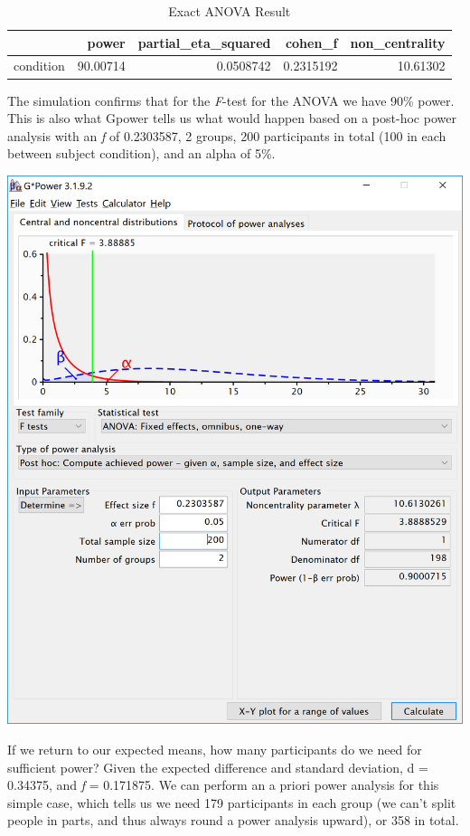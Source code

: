 \documentclass[
]{book}
\begin{document}
\begin{table}[!h]

\caption{\label{tab:unnamed-chunk-23}Exact ANOVA Result}
\centering
\begin{tabular}[t]{l|r|r|r|r}
\hline
  & power & partial\_eta\_squared & cohen\_f & non\_centrality\\
\hline
condition & 90.00714 & 0.0508742 & 0.2315192 & 10.61302\\
\hline
\end{tabular}
\end{table}

The simulation confirms that for the \emph{F}-test for the ANOVA we have 90\% power. This is also what Gpower tells us what would happen based on a post-hoc power analysis with an \emph{f} of 0.2303587, 2 groups, 200 participants in total (100 in each between subject condition), and an alpha of 5\%.

\includegraphics{screenshots/gpower_8.png}

If we return to our expected means, how many participants do we need for sufficient power? Given the expected difference and standard deviation, d = 0.34375, and \emph{f} = 0.171875. We can perform an a priori power analysis for this simple case, which tells us we need 179 participants in each group (we can't split people in parts, and thus always round a power analysis upward), or 358 in total.
\end{document}
